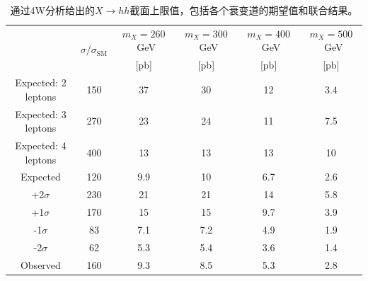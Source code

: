\begin{table}[h]
\scriptsize
  \centering
\begin{tabular}{c c c c c c} 
    \hline
    & \multicolumn{1}{c}{\multirow{2}{*}{$\sigma/\sigma_{\text{SM}}$}} & \multicolumn{1}{c}{$m_X = 260$~GeV} & \multicolumn{1}{c}{$m_X = 300$~GeV} & \multicolumn{1}{c}{$m_X = 400$~GeV} & \multicolumn{1}{c}{$m_X = 500$~GeV} \\
    & & [pb] &  [pb] &  [pb] &  [pb]  \\
    \hline
    \hline
    Expected: 2 leptons &150 & 37 & 30 & 12 & 3.4 \\
    \hline
    Expected: 3 leptons & 270 & 23 & 24 & 11 & 7.5 \\
    \hline
    Expected: 4 leptons & 400 & 13 & 13 & 13 & 10 \\
    \hline
    \hline
    Expected & 120 & 9.9 & 10 & 6.7 & 2.6 \\
    \hline
    +2$\sigma$ & 230 & 21 & 21 & 14 & 5.8 \\
    \hline
    +1$\sigma$ & 170 & 15 & 15 & 9.7 & 3.9 \\
    \hline
    -1$\sigma$ & 83 & 7.1 & 7.2 & 4.9 & 1.9 \\
    \hline
    -2$\sigma$ & 62 & 5.3 & 5.4 & 3.6 & 1.4 \\
    \hline
    \hline
    Observed & 160 & 9.3 & 8.5 & 5.3 & 2.8 \\
    \hline
  \end{tabular}
\caption{通过4W分析给出的$X\rightarrow hh$截面上限值，包括各个衰变道的期望值和联合结果。}
  \label{tab:limit-comb}
\end{table}
